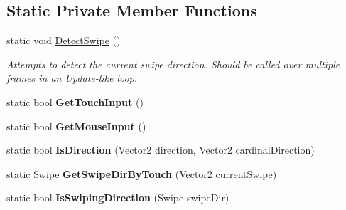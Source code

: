 \subsection*{Static Private Member Functions}
\begin{DoxyCompactItemize}
\item 
static void \mbox{\hyperlink{class_swipe_manager_aba02a3bfacb5b0b8f6511bdf625158a5}{Detect\+Swipe}} ()
\begin{DoxyCompactList}\small\item\em Attempts to detect the current swipe direction. Should be called over multiple frames in an Update-\/like loop. \end{DoxyCompactList}\item 
\mbox{\label{class_swipe_manager_a4fbc4f757be9e28031689e12061faccb}} 
static bool {\bfseries Get\+Touch\+Input} ()
\item 
\mbox{\label{class_swipe_manager_a4385f3e9d6f93d611dba28793764201e}} 
static bool {\bfseries Get\+Mouse\+Input} ()
\item 
\mbox{\label{class_swipe_manager_ad453edd0d555b713e307621a16cd39da}} 
static bool {\bfseries Is\+Direction} (Vector2 direction, Vector2 cardinal\+Direction)
\item 
\mbox{\label{class_swipe_manager_af103ce035646fb75186f021903a71bff}} 
static Swipe {\bfseries Get\+Swipe\+Dir\+By\+Touch} (Vector2 current\+Swipe)
\item 
\mbox{\label{class_swipe_manager_aa877bc8744e08690a29cc301ee1bd1ef}} 
static bool {\bfseries Is\+Swiping\+Direction} (Swipe swipe\+Dir)
\end{DoxyCompactItemize}

